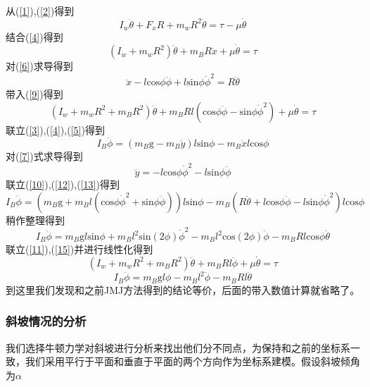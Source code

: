 \documentclass[UTF8,a4paper]{paper}
\begin{document}
从(\ref{1}),(\ref{2})得到
\begin{equation}
I_w\ddot{\theta}+F_xR+m_wR^2\ddot{\theta}=\tau-\mu\dot{\theta}
\label{8}
\end{equation}
结合(\ref{4})得到
\begin{equation}
(I_w+m_wR^2)\ddot{\theta}+m_BR\ddot{x}+\mu\dot{\theta}=\tau
\label{9}
\end{equation}
对(\ref{6})求导得到
\begin{equation}
\ddot{x}-l\mathrm{cos}\phi\ddot{\phi}+l\mathrm{sin}\phi\dot{\phi}^2=R\ddot{\theta}
\label{10}
\end{equation}
带入(\ref{9})得到
\begin{equation}
(I_w+m_wR^2+m_BR^2)\ddot{\theta}+m_BRl(\mathrm{cos}\phi\ddot{\phi}-\mathrm{sin}\phi\dot{\phi}^2)+\mu\dot{\theta}=\tau
\label{11}
\end{equation}
联立(\ref{3}),(\ref{4}),(\ref{5})得到
\begin{equation}
I_B\ddot{\phi}=(m_B\mathrm{g}-m_B\ddot{y})l\mathrm{sin}\phi-m_B\ddot{x}l\mathrm{cos}\phi
\label{12}
\end{equation}
对(\ref{7})式求导得到
\begin{equation}
\ddot{y}=-l\mathrm{cos}\phi\dot{\phi}^2-l\mathrm{sin}\phi\ddot{\phi}
\label{13}
\end{equation}
联立(\ref{10}),(\ref{12}),(\ref{13})得到
\begin{equation}
I_B\ddot{\phi}=(m_B\mathrm{g}+m_Bl(\mathrm{cos}\phi\dot{\phi}^2+\mathrm{sin}\phi\ddot{\phi}))l\mathrm{sin}\phi-m_B(R\ddot{\theta}+l\mathrm{cos}\phi\ddot{\phi}-l\mathrm{sin}\phi\dot{\phi}^2)l\mathrm{cos}\phi
\label{14}
\end{equation}
稍作整理得到
\begin{equation}
I_B\ddot{\phi}=m_B\mathrm{g}l\mathrm{sin}\phi + m_Bl^2\mathrm{sin}(2\phi) \dot{\phi}^2-m_Bl^2 \mathrm{cos}(2\phi)\ddot{\phi}-m_BRl\mathrm{cos}\phi\ddot{\theta}
\label{15}
\end{equation}
联立(\ref{11}),(\ref{15})并进行线性化得到
\begin{equation}
(I_w+m_wR^2+m_BR^2)\ddot{\theta}+m_BRl\ddot{\phi}+\mu\dot{\theta}=\tau
\label{16}
\end{equation}
\begin{equation}
I_B\ddot{\phi}=m_B\mathrm{g}l\phi-m_Bl^2 \ddot{\phi}-m_BRl\ddot{\theta}
\label{17}
\end{equation}
到这里我们发现和之前JMJ方法得到的结论等价，后面的带入数值计算就省略了。
\subsubsection{斜坡情况的分析}
我们选择牛顿力学对斜坡进行分析来找出他们分不同点，为保持和之前的坐标系一致，我们采用平行于平面和垂直于平面的两个方向作为坐标系建模。假设斜坡倾角为$\alpha$
\end{document}
